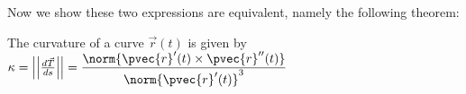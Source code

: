 \documentclass[12pt]{article}
\begin{document}
\begin{enumerate}
Now we show these two expressions are equivalent, namely the following theorem:

\begin{theorem}
The curvature of a curve $\vec{r}(t)$ is given by $\kappa = \left|\left|\frac{d\vec{T}}{ds}\right|\right| = \dfrac{\norm{\pvec{r}'(t) \times \pvec{r}''(t)}}{\norm{\pvec{r}'(t)}^3}$
\end{theorem}

\end{enumerate}
\end{document}
